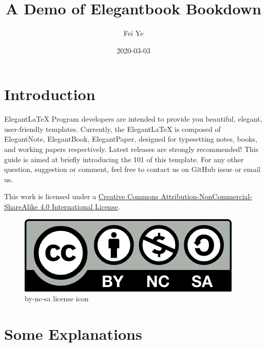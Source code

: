 \documentclass[en,11pt]{elegantbook}
\title{A Demo of Elegantbook Bookdown}
\author{Fei Ye}
\date{2020-03-03}
\renewcommand{\baselinestretch}{1.1}
\renewcommand{\baselinestretch}{0.975}
\begin{document}
\maketitle

{
\setcounter{tocdepth}{0}
\tableofcontents
}
\mainmatter

\hypersetup{pageanchor=true}

\renewcommand{\baselinestretch}{1.05}\normalsize

\captionsetup[figure]{labelformat=empty}
\captionsetup[subfigure]{labelformat=empty}

\hypertarget{introduction}{%
\chapter*{Introduction}\label{introduction}}

ElegantLaTeX Program developers are intended to provide you beautiful, elegant, user-friendly templates. Currently, the ElegantLaTeX is composed of ElegantNote, ElegantBook, ElegantPaper, designed for typesetting notes, books, and working papers respectively. Latest releases are strongly recommended! This guide is aimed at briefly introducing the 101 of this template. For any other question, suggestion or comment, feel free to contact us on GitHub issue or email us.

This work is licensed under a \href{https://creativecommons.org/licenses/by-nc-sa/4.0/}{Creative Commons Attribution-NonCommercial-ShareAlike 4.0 International License}.

\begin{figure}
\centering
\includegraphics{figs/by-nc-sa.png}
\caption{by-nc-sa license icon}
\end{figure}

\hypertarget{some-explanations}{%
\chapter{Some Explanations}\label{some-explanations}}
\end{document}
